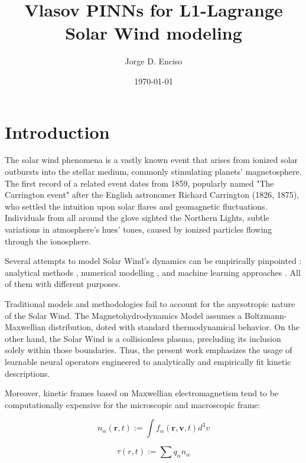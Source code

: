 \documentclass[12pt]{article}
\title{Vlasov PINNs for L1-Lagrange Solar Wind modeling}
\author{Jorge D. Enciso}
\date{\today}
\begin{document}
\maketitle

\begin{abstract}
\end{abstract}

\tableofcontents
\newpage

\section{Introduction}

The solar wind phenomena is a vastly known event that arises from ionized solar outbursts into the stellar medium, commonly stimulating planets' magnetosphere. \cite{Gosling2007} The first record of a related event dates from 1859, popularly named "The Carrington event" after the English astronomer Richard Carrington (1826, 1875), who settled the intuition upon solar flares and geomagnetic fluctuations. Individuals from all around the glove sighted the Northern Lights, subtle variations in atmosphere's hues' tones, caused by ionized particles flowing through the ionosphere.

Several attempts to model Solar Wind's dynamics can be empirically pinpointed : analytical methods \cite{}, numerical modelling \cite{2006LNCS.3732..554E, 10.3389/fspas.2023.1105797, windmodelling1}, and machine learning approaches \cite{comp_1, comp_2, comp_3}. All of them with different purposes.

Traditional models and methodologies fail to account for the anysotropic nature of the Solar Wind. The Magnetohydrodynamics Model assumes a Boltzmann-Maxwellian distribution, doted with standard thermodynamical behavior. On the other hand, the Solar Wind is a collisionless plasma, precluding its inclusion solely within those boundaries. Thus, the present work emphasizes the usage of learnable neural operators engineered to analytically and empirically fit kinetic descriptions.

Moreover, kinetic frames based on Maxwellian electromagnetism tend to be computationally expensive for the microscopic and macroscopic frame:

\begin{equation}
    n_{\alpha} (\mathbf{r}, t) := \int f_{\alpha}(\mathbf{r}, \mathbf{v}, t) d^3v
\end{equation}

\begin{equation}
    \tau(r, t) := \sum q_{\alpha} n_{\alpha}
\end{equation}
\end{document}
